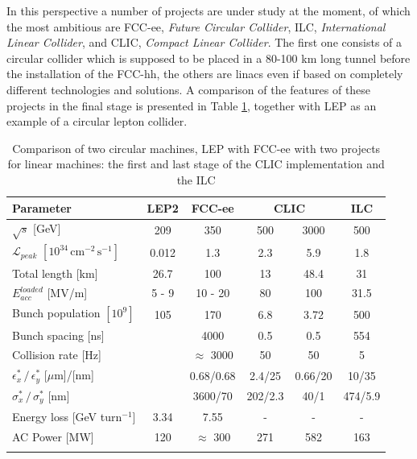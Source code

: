 In this perspective a number of projects are under study at the moment, of which the most ambitious are FCC-ee, \textit{Future Circular Collider}, ILC, \textit{International Linear Collider}, and CLIC, \textit{Compact Linear Collider}. The first one consists of a circular collider which is supposed to be placed in a 80-100 km long tunnel before the installation of the FCC-hh, the others are linacs even if based on completely different technologies and solutions.  A comparison of the features of these projects in the final stage is presented in Table \ref{table_CLIC_ILC_FCC}, together with LEP as an example of a circular lepton collider.

\begin{table}
  \centering
    \begin{tabular}{ l c c | c c c }
    \toprule
    \textbf{Parameter}								& \textbf{LEP2}	&	\textbf{FCC-ee}	&  \multicolumn{2}{c}{\textbf{CLIC}}	&	\textbf{ILC}	\\
    \midrule
    $\sqrt{s}$ [GeV]								& 209	& 350  			&  	500	&  3000	& 500	\\
    $\mathscr{L}_{peak}$  $[10^{34} \, \text{cm}^{-2} \, \text{s}^{-1}]$	&0.012	& 1.3				&  	2.3	& 	5.9	&1.8		\\
    Total length [km]								&26.7	& 100			& 13		&  48.4	& 31		\\
    $E_{acc}^{loaded}$ [MV/m]						& 5 - 9	& 10 - 20			& 80		& 100 	& 31.5	\\
    Bunch population $[10^9]$						& 105	& 170  			&  6.8	& 	3.72	& 500	\\
    Bunch spacing [ns]							& 		& 4000	  		&  	0.5	& 	0.5	& 554	\\
    Collision rate [Hz]								&  		&$\approx$ 3000	&  	50	& 	50	& 5		\\
    $\epsilon^*_x \, / \, \epsilon^*_y $ [$\mu$m]/[nm]		& 		&  	0.68/0.68	        		&  2.4/25	& 0.66/20	& 10/35	\\  
    $\sigma^*_x\, / \, \sigma^*_y$ [nm]				& 		&  	3600/70		&  202/2.3	& 40/1	&474/5.9	\\    
    Energy loss [GeV turn$^{-1}$]					&  3.34	& 	7.55			& - 		& -		& -		\\
    AC Power [MW]								&  120	& $\approx$ 300		& 271	& 582	& 163	\\
    \bottomrule
    \label{CLIC_param_table}
    \end{tabular}
  \caption{Comparison of two circular machines, LEP\cite{Aull:2156972,LEP:RF} with FCC-ee\cite{FCC-ee:leptonCollParam,Zimmermann:2057706} with two projects for linear machines: the first and last stage of the CLIC implementation \cite{CLIC:cdr} and the ILC\cite{ILC:tdr} }\label{table_CLIC_ILC_FCC}
\end{table}



